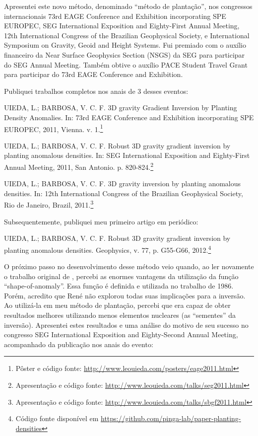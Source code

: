 Apresentei este novo método, denominado ``método de plantação'',  nos
congressos internacionais
73rd EAGE Conference and Exhibition incorporating SPE EUROPEC,
SEG International Exposition and Eighty-First Annual Meeting,
12th International Congress of the Brazilian Geophysical Society,
e
International Symposium on Gravity, Geoid and Height Systems.
Fui premiado com o auxílio financeiro da Near Surface Geophysics Section (NSGS)
da SEG para participar do SEG Annual Meeting.
Também obtive o auxílio PACE Student Travel Grant para participar do 73rd EAGE
Conference and Exhibition.

Publiquei trabalhos completos nos anais de 3 desses eventos:

\begin{displayquote}
    UIEDA, L.; BARBOSA, V. C. F. 3D gravity Gradient Inversion by Planting
    Density Anomalies. In: 73rd EAGE Conference and Exhibition incorporating
    SPE EUROPEC, 2011, Vienna. v. 1.\footnote{Pôster e código fonte:
    \url{http://www.leouieda.com/posters/eage2011.html}}
\end{displayquote}

\begin{displayquote}
    UIEDA, L.; BARBOSA, V. C. F. Robust 3D gravity gradient
    inversion by planting anomalous densities. In: SEG International Exposition
    and Eighty-First Annual Meeting, 2011, San Antonio. p.
    820-824.\footnote{Apresentação e código fonte:
    \url{http://www.leouieda.com/talks/seg2011.html}}
\end{displayquote}

\begin{displayquote}
    UIEDA, L.; BARBOSA, V. C. F. 3D gravity inversion by planting
    anomalous densities. In: 12th International Congress of the Brazilian
    Geophysical Society, Rio de Janeiro, Brazil,
    2011.\footnote{Apresentação e código fonte:
    \url{http://www.leouieda.com/talks/sbgf2011.html}}
\end{displayquote}

Subsequentemente, publiquei meu primeiro artigo em periódico:

\begin{displayquote}
    UIEDA, L.; BARBOSA, V. C. F. Robust 3D gravity gradient inversion by
    planting anomalous densities. Geophysics, v. 77, p. G55-G66,
    2012.\footnote{Código fonte disponível em
    \url{https://github.com/pinga-lab/paper-planting-densities}}
\end{displayquote}

O próximo passo no desenvolvimento desse método veio quando, ao ler novamente o
trabalho original de \citet{rene}, percebi as enormes vantagens da utilização
da função ``shape-of-anomaly''.
Essa função é definida e utilizada no trabalho de 1986.
Porém, acredito que René não explorou todas suas implicações para a inversão.
Ao utilizá-la em meu método de plantação, percebi que era capaz de obter
resultados melhores utilizando menos elementos nucleares (as ``sementes'' da
inversão).
Apresentei estes resultados e uma análise do motivo de seu sucesso no congresso
SEG International Exposition and Eighty-Second Annual Meeting,
acompanhado da publicação nos anais do evento:

